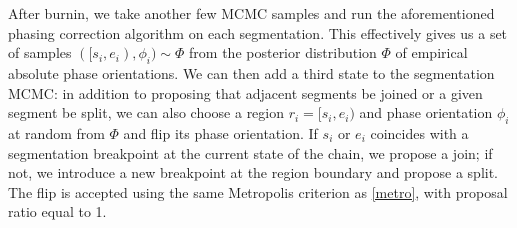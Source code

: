 \documentclass[10pt,letter]{article}
\numberwithin{equation}{section}
\begin{document}
After burnin, we take another few MCMC samples and run the aforementioned phasing correction algorithm on each segmentation. This effectively gives us a set of samples $([s_i,e_i),\phi_i)\sim\Phi$ from the posterior distribution $\Phi$ of empirical absolute phase orientations. We can then add a third state to the segmentation MCMC: in addition to proposing that adjacent segments be joined or a given segment be split, we can also choose a region $r_i=[s_i,e_i)$ and phase orientation $\phi_i$ at random from $\Phi$ and flip its phase orientation. If $s_i$ or $e_i$ coincides with a segmentation breakpoint at the current state of the chain, we propose a join; if not, we introduce a new breakpoint at the region boundary and propose a split. The flip is accepted using the same Metropolis criterion as \eqref{metro}, with proposal ratio equal to 1.
\end{document}
